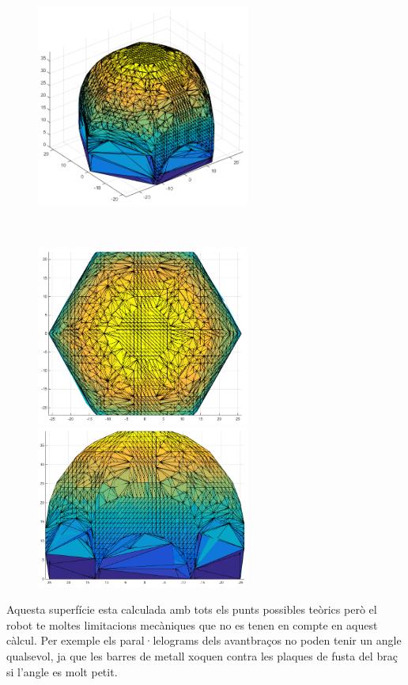 \begin{figure}[h!]
\centering
\begin{minipage}{7cm}
\centering
\includegraphics[width=7cm]{./images/rangTreball}
\end{minipage}
\\
\hfill
\begin{minipage}{7cm}
\centering
\includegraphics[width=7cm]{./images/rangTreball2}
\end{minipage}
\hfill
\begin{minipage}{7cm}
\centering
\includegraphics[width=7cm]{./images/rangTreball3}
\end{minipage}
\hfill
\end{figure}

Aquesta superfície esta calculada amb tots els punts possibles teòrics però el robot te moltes limitacions mecàniques que no es tenen en compte en aquest càlcul. Per exemple els paral·lelograms dels avantbraços no poden tenir un angle qualsevol, ja que les barres de metall xoquen contra les plaques de fusta del braç si l'angle es molt petit.

